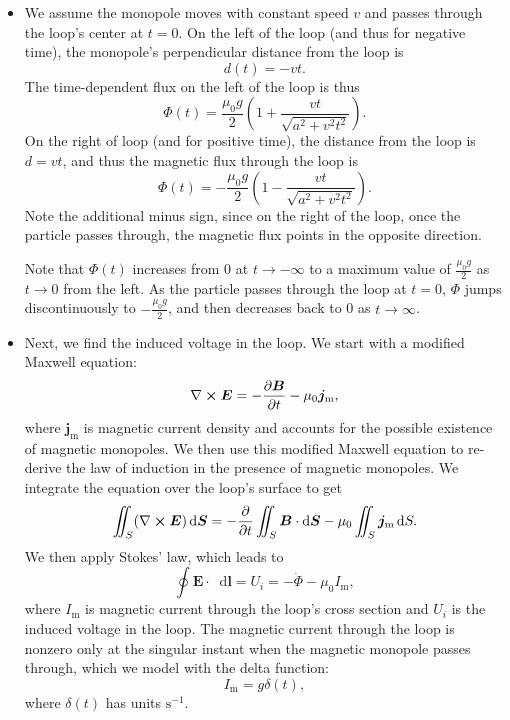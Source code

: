 \documentclass[11pt, a4paper]{article}
\newcommand{\diff}{\mathop{}\!\mathrm{d}} %
\renewcommand{\vec}[1]{\bm{#1}} %
\newcommand{\E}{\vec{E}}  %
\newcommand{\B}{\vec{B}}  %
\newcommand{\mm}{\mu_{0}}  %
\newcommand{\m}{\vec{m}}  %
\renewcommand{\curl}{\nabla \cross}
\begin{document}
\begin{itemize}
	\item We assume the monopole moves with constant speed $ v $ and passes through the loop's center at $ t = 0 $. On the left of the loop (and thus for negative time), the monopole's perpendicular distance from the loop is
	\begin{equation*}
		d(t) = - vt.
	\end{equation*}
	The time-dependent flux on the left of the loop is thus
	\begin{equation*}
		\Phi(t) = \frac{\mm g}{2}\left(1 + \frac{vt}{\sqrt{a^{2} +v^{2}t^{2}}}\right).
	\end{equation*}
	On the right of loop (and for positive time), the distance from the loop is $ d = vt $, and thus the magnetic flux through the loop is
	\begin{equation*}
		\Phi(t) = -\frac{\mm g}{2}\left(1 - \frac{vt}{\sqrt{a^{2} +v^{2}t^{2}}}\right).
	\end{equation*}
	Note the additional minus sign, since on the right of the loop, once the particle passes through, the magnetic flux points in the opposite direction.
	
	Note that $ \Phi(t) $ increases from $ 0 $ at $ t \to -\infty $ to a maximum value of $ \frac{\mm g}{2} $ as $ t \to 0 $ from the left. As the particle passes through the loop at $ t = 0 $, $ \Phi $ jumps discontinuously to $ - \frac{\mm g}{2}  $, and then decreases back to 0 as $ t \to \infty $. 
	
	\item Next, we find the induced voltage in the loop. We start with a modified Maxwell equation:
	\begin{equation*}
		\curl \E = - \pdv{\B}{t} - \mm \vec{j}_{\text{m}},
	\end{equation*}
	where $ \vec{j}_{\text{m}} $ is magnetic current density and accounts for the possible existence of magnetic monopoles. We then use this modified Maxwell equation to re-derive the law of induction in the presence of magnetic monopoles. We integrate the equation over the loop's surface to get
	\begin{equation*}
		\iint_{S} (\curl \E)\diff \vec{S} = - \pdv{t}\iint_{S} \B \cdot \diff \vec{S} - \mm \iint_{S} \vec{j}_{\text{m}}\diff S.
	\end{equation*}
	We then apply Stokes' law, which leads to
	\begin{equation*}
		\oint \E \cdot \diff \vec{l} = U_{i} = - \dot{\Phi} - \mm I_{\text{m}},
	\end{equation*}
	where $ I_{\text{m}} $ is magnetic current through the loop's cross section and $ U_{i} $ is the induced voltage in the loop. The magnetic current through the loop is nonzero only at the singular instant when the magnetic monopole passes through, which we model with the delta function:
	\begin{equation*}
		I_{\text{m}} = g \delta (t),
	\end{equation*}
	where $ \delta(t) $ has units $ \si{\second^{-1}} $. 
	

\end{itemize}
\end{document}
